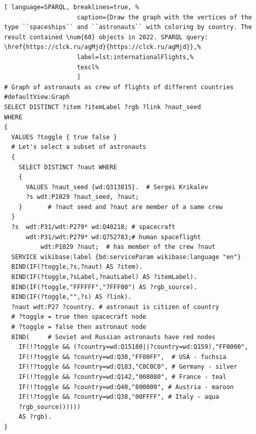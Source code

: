 \begin{lstlisting}[ language=SPARQL, breaklines=true, %
                    caption={Draw the graph with the vertices of the type ``spaceships`` and ``astronauts`` with coloring by country. The result contained \num{68} objects in 2022. SPARQL query: \href{https://clck.ru/agMjd}{https://clck.ru/agMjd}},%
                    label=lst:internationalFlights,%
                    texcl%
                    ]
# Graph of astronauts as crew of flights of different countries
#defaultView:Graph
SELECT DISTINCT ?item ?itemLabel ?rgb ?link ?naut_seed
WHERE
{ 
  VALUES ?toggle { true false }
  # Let's select a subset of astronauts
  {
    SELECT DISTINCT ?naut WHERE
    { 
      VALUES ?naut_seed {wd:Q313815}.  # Sergei Krikalev
      ?s wdt:P1029 ?naut_seed, ?naut;  
    }       # ?naut seed and ?naut are member of a same crew
  }
  ?s  wdt:P31/wdt:P279* wd:Q40218; # spacecraft
      wdt:P31/wdt:P279* wd:Q752783;# human spaceflight
          wdt:P1029 ?naut;  # has member of the crew ?naut    
  SERVICE wikibase:label {bd:serviceParam wikibase:language "en"}
  BIND(IF(?toggle,?s,?naut) AS ?item).
  BIND(IF(?toggle,?sLabel,?nautLabel) AS ?itemLabel).
  BIND(IF(?toggle,"FFFFFF","7FFF00") AS ?rgb_source).
  BIND(IF(?toggle,"",?s) AS ?link).
  ?naut wdt:P27 ?country. # astronaut is citizen of country 
  # ?toggle = true then spacecraft node
  # ?toggle = false then astronaut node
  BIND(     # Soviet and Russian astronauts have red nodes
    IF(!?toggle && (?country=wd:Q15180||?country=wd:Q159),"FF0000",
    IF(!?toggle && ?country=wd:Q30,"FF00FF",  # USA - fuchsia
    IF(!?toggle && ?country=wd:Q183,"C0C0C0", # Germany - silver
    IF(!?toggle && ?country=wd:Q142,"008080", # France - teal
    IF(!?toggle && ?country=wd:Q40,"800000", # Austria - maroon
    IF(!?toggle && ?country=wd:Q38,"00FFFF", # Italy - aqua
    ?rgb_source))))))
    AS ?rgb).
}
\end{lstlisting}%

